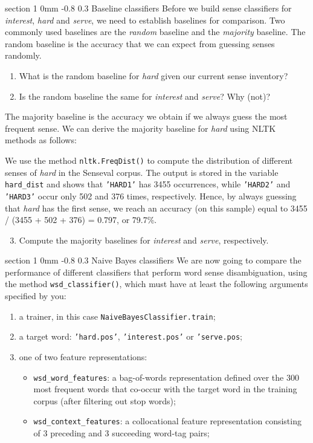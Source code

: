 \documentclass[11pt]{article}
\makeatletter
\newcommand{\newsec}[2]{\section{#1}\label{sec:#2}\noindent}
\renewcommand{\section}{\@startsection
{section}%
{1}%
{0mm}%
{-0.8\baselineskip}%
{0.3\baselineskip}%
{\bfseries\large}}%
\makeatother
\begin{document}
\newsec{Baseline classifiers}{baseline}%
Before we build sense classifiers for \emph{interest}, \emph{hard} and \emph{serve}, we need to establish baselines for comparison.
Two commonly used baselines are the \emph{random} baseline and the \emph{majority} baseline. The random baseline is the accuracy that we can expect from guessing senses randomly. 
\begin{enumerate}[topsep=0.2cm,noitemsep]
\item What is the random baseline for \emph{hard} given our current sense inventory?
\item Is the random baseline the same for \emph{interest} and \emph{serve}? Why (not)?
\end{enumerate}
The majority baseline is the accuracy we obtain if we always guess the most frequent sense. We can derive the majority baseline
for \emph{hard} using NLTK methods as follows:
\begin{center}
\fbox{
\scalebox{0.9}{

}}
\end{center}
We use the method {\tt nltk.FreqDist()} to compute the distribution of different senses of \emph{hard} in the Senseval 
corpus. The output is stored in the variable {\tt hard\_dist} and shows that {\tt 'HARD1'} has 3455 occurrences, while {\tt 'HARD2'} 
and {\tt 'HARD3'} occur only 502 and 376 times, respectively. Hence, by always guessing that \emph{hard} has the first sense,
we reach an accuracy (on this sample) equal to 3455 / (3455 + 502 + 376) = 0.797, or 79.7\%.
\begin{enumerate}[topsep=0.2cm,noitemsep]
\setcounter{enumi}{2}
\item Compute the majority baselines for \emph{interest} and \emph{serve}, respectively.
\end{enumerate}
\newsec{Naive Bayes classifiers}{naive}%
We are now going to compare the performance of different classifiers that perform word sense disambiguation, using
the method {\tt wsd\_classifier()}, which must have at least the following arguments specified by you:
\begin{enumerate}[topsep=0.2cm,noitemsep]
\item a trainer, in this case {\tt NaiveBayesClassifier.train};
\item a target word: {\tt 'hard.pos'}, {\tt 'interest.pos'} or {\tt 'serve.pos};
\item one of two feature representations:
\begin{itemize}[noitemsep,topsep=0.1cm]
\item {\tt wsd\_word\_features}:
a bag-of-words representation defined over the 300 most frequent words that co-occur with the target word in the training corpus
(after filtering out stop words);
\item {\tt wsd\_context\_features}:
a collocational feature representation consisting of 3 preceding and 3 succeeding word-tag pairs;
\end{itemize}
\end{enumerate}
\end{document}

